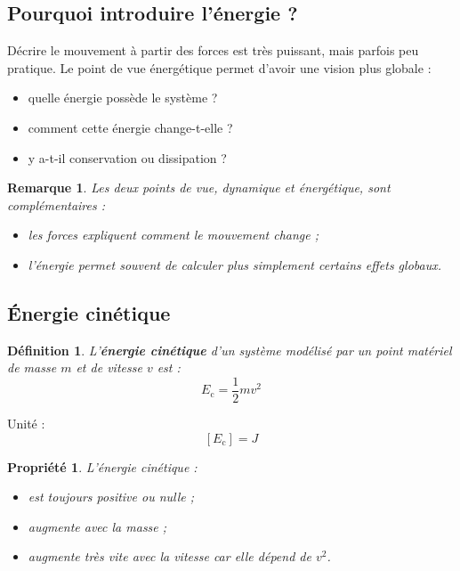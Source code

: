 \documentclass[11pt,a4paper]{article}
\newtheorem{definition}{Définition}[section]
\newtheorem{propriete}{Propriété}[section]
\newtheorem{remarque}{Remarque}[section]
\newcommand{\Ec}{E_\mathrm{c}}
\begin{document}
\subsection{Pourquoi introduire l'énergie ?}

Décrire le mouvement à partir des forces est très puissant, mais parfois peu pratique.  
Le point de vue énergétique permet d'avoir une vision plus globale :

\begin{itemize}
    \item quelle énergie possède le système ?
    \item comment cette énergie change-t-elle ?
    \item y a-t-il conservation ou dissipation ?
\end{itemize}

\begin{remarque}
Les deux points de vue, dynamique et énergétique, sont complémentaires :
\begin{itemize}
    \item les forces expliquent comment le mouvement change ;
    \item l'énergie permet souvent de calculer plus simplement certains effets globaux.
\end{itemize}
\end{remarque}

\subsection{Énergie cinétique}

\begin{definition}
L'\textbf{énergie cinétique} d'un système modélisé par un point matériel de masse $m$ et de vitesse $v$ est :
\[
\Ec = \frac{1}{2}mv^2
\]
\end{definition}

Unité :
\[
[\Ec]=\si{J}
\]

\begin{propriete}
L'énergie cinétique :
\begin{itemize}
    \item est toujours positive ou nulle ;
    \item augmente avec la masse ;
    \item augmente très vite avec la vitesse car elle dépend de $v^2$.
\end{itemize}
\end{propriete}
\end{document}
